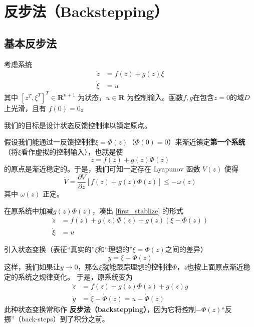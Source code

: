 \newpage
\section{反步法（Backstepping）}\label{5Dref}
\subsection{基本反步法}
考虑系统
\begin{equation}
    \begin{aligned}
  \dot{z} & = f (z) + g (z) \xi\\
  \dot{\xi} & = u
\end{aligned}\label{Sys:backstep:basic:original}
\end{equation}
其中 $[z^T, \xi^T]^T \in \mathbf{R}^{n + 1}$ 为状态，$u \in
\mathbf{R}$ 为控制输入。函数$f, g$在包含$z = 0$的域$D$上光滑，且有 $f (0) = 0$。

我们的目标是设计状态反馈控制律以镇定原点。%

假设我们能通过一反馈控制律$\xi = \Phi (z)$（$\Phi (0) = 0$）来渐近镇定{\bf 第一个系统}（将$\xi$看作虚拟的控制输入），也就是使
\begin{equation}
    \dot{z} = f (z) + g (z) \Phi (z) \label{first_stablize}
\end{equation}
的原点是渐近稳定的。于是，我们可知一定存在 Lyapunov 函数 $V (z)$ 使得
\[ \dot{V} = \frac{\partial V}{\partial z} [f (z) + g (z) \Phi (z)] \leq -
   \omega (z) \]
其中 $\omega (z)$ 正定。

在原系统中加减$g (z) \Phi (z)$，凑出 \eqref{first_stablize} 的形式
\begin{equation}
   \begin{aligned}
  \dot{z} & = f (z) + g (z) \Phi (z) + g (z) (\xi - \Phi (z))\\
  \dot{\xi} & = u
\end{aligned} \label{Sys:backstep:basic:control}
\end{equation}

引入状态变换（表征“真实的”$\xi$和“理想的”$\xi=\Phi (z)$之间的差异）
\[ y = \xi - \Phi (z) \]
这样，我们如果让$y\to 0$，那么$\xi$就能跟踪理想的控制律$\Phi$，$z$也按上面原点渐近稳定的系统之规律变化。
于是，原系统变为
\begin{equation}
    \begin{aligned}
  \dot{z} & = f (z) + g (z) \Phi (z) + g (z) y\\
  \dot{y} & = \dot{\xi}-\dot{\Phi} (z) = u - \dot{\Phi} (z)
\end{aligned}\label{Sys:backstep:basic:backstep}
\end{equation}
此种状态变换常称作 {\textbf{反步法（backstepping）}}，因为它将控制$- \Phi (z)$“反挪”（back-steps）到了积分之前。

